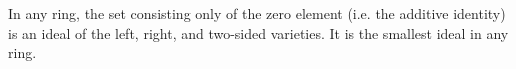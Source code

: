 \documentclass[12pt]{article}
\begin{document}
In any ring, the set consisting only of the zero element (i.e. the additive identity) is an ideal of the left, right, and two-sided varieties.  It is the smallest ideal in any ring.
\end{document}
